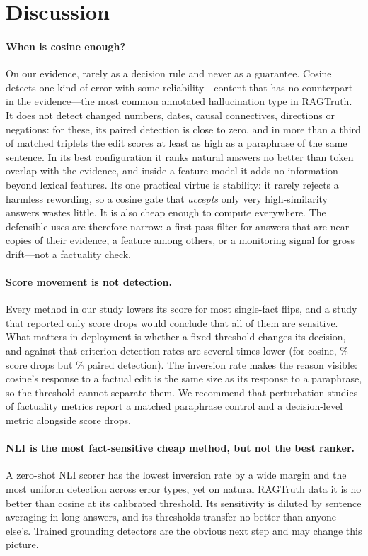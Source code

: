 \section{Discussion}
\label{sec:discussion}

\paragraph{When is cosine enough?} On our evidence, rarely as a decision rule and never as a guarantee. Cosine detects one kind of error with some reliability---content that has no counterpart in the evidence---the most common annotated hallucination type in RAGTruth. It does not detect changed numbers, dates, causal connectives, directions or negations: for these, its paired detection is close to zero, and in more than a third of matched triplets the edit scores at least as high as a paraphrase of the same sentence. In its best configuration it ranks natural answers no better than token overlap with the evidence, and inside a feature model it adds no information beyond lexical features. Its one practical virtue is stability: it rarely rejects a harmless rewording, so a cosine gate that \emph{accepts} only very high-similarity answers wastes little. It is also cheap enough to compute everywhere. The defensible uses are therefore narrow: a first-pass filter for answers that are near-copies of their evidence, a feature among others, or a monitoring signal for gross drift---not a factuality check.

\paragraph{Score movement is not detection.} Every method in our study lowers its score for most single-fact flips, and a study that reported only score drops would conclude that all of them are sensitive. What matters in deployment is whether a fixed threshold changes its decision, and against that criterion detection rates are several times lower (for cosine, \CfCosDrop\% score drops but \CfCosDetect\% paired detection). The inversion rate makes the reason visible: cosine's response to a factual edit is the same size as its response to a paraphrase, so the threshold cannot separate them. We recommend that perturbation studies of factuality metrics report a matched paraphrase control and a decision-level metric alongside score drops.

\paragraph{NLI is the most fact-sensitive cheap method, but not the best ranker.} A zero-shot NLI scorer has the lowest inversion rate by a wide margin and the most uniform detection across error types, yet on natural RAGTruth data it is no better than cosine at its calibrated threshold. Its sensitivity is diluted by sentence averaging in long answers, and its thresholds transfer no better than anyone else's. Trained grounding detectors \citep{tang2024minicheck,zha2023alignscore} are the obvious next step and may change this picture.


